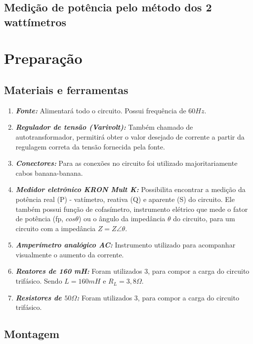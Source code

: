 \documentclass[a4paper,12pt,oneside,openany,table,xcdraw]{article}
\begin{document}
\subsection{Medição de potência pelo método dos 2 wattímetros} \label{potencias}


\section{Preparação}
\subsection{Materiais e ferramentas} %
\begin{enumerate}[1 -]
\item \emph{\textbf{Fonte:}}
Alimentará todo o circuito. Possui frequência de $60Hz$.

\item \emph{\textbf{Regulador de tensão (Varivolt):}}
Também chamado de autotransformador, permitirá obter o valor desejado de corrente a partir da regulagem correta da tensão fornecida pela fonte.

\item \emph{\textbf{Conectores:}}
Para as conexões no circuito foi utilizado majoritariamente cabos banana-banana.

\item \emph{\textbf{Medidor eletrônico KRON Mult K:}}
Possibilita encontrar a medição da potência real (P) - vatímetro, reativa (Q) e aparente (S) do circuito. Ele também possui função de cofasímetro, instrumento elétrico que mede o fator de potência (fp, $cos\theta$) ou o ângulo da impedância $\theta$ do circuito, para um circuito com a impedância $Z = Z\angle \theta$.

\item \emph{\textbf{Amperímetro analógico AC:}}
Instrumento utilizado para acompanhar visualmente o aumento da corrente.

\item \emph{\textbf{Reatores de 160 mH:}}
Foram utilizados 3, para compor a carga do circuito trifásico. Sendo $L=160mH$ e $R_L=3,8\Omega$.

\item \emph{\textbf{Resistores de $50\Omega$:}}
Foram utilizados 3, para compor a carga do circuito trifásico.
\end{enumerate}

\subsection{Montagem} %
\end{document}
